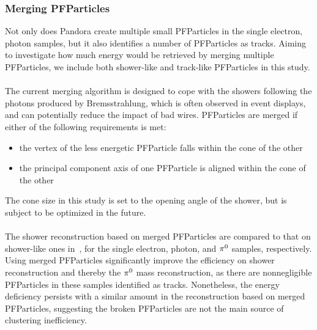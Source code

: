 \subsubsection{Merging PFParticles}
\label{sec:merging}

Not only does Pandora create multiple small PFParticles in
the single electron, photon samples,
but it also identifies a number of PFParticles as tracks.
Aiming to investigate how much energy would be retrieved by merging
multiple PFParticles, we include both shower-like and track-like
PFParticles in this study.\\
\\
The current merging algorithm is designed to cope with the showers
following the photons produced by Bremsstrahlung,
which is often observed in event displays,
and can potentially reduce the impact of bad wires.
PFParticles are merged if either of the following requirements is met:
\begin{itemize}
\item the vertex of the less energetic PFParticle falls within the 
      cone of the other
\item the principal component axis of one PFParticle is aligned
      within the cone of the other
\end{itemize}
The cone size in this study is set to the opening angle of the shower,
but is subject to be optimized in the future.\\
\\
The shower reconstruction based on merged PFParticles are compared
to that on shower-like ones in~,
for the single electron, photon, and ${\pi}^0$ samples, respectively.
Using merged PFParticles significantly improve the efficiency on
shower reconstruction and thereby the ${\pi}^0$ mass reconstruction,
as there are nonnegligible PFParticles in these samples identified
as tracks.
Nonetheless, the energy deficiency persists with a similar amount in
the reconstruction based on merged PFParticles, suggesting the broken
PFParticles are not the main source of clustering inefficiency.\\
\\
